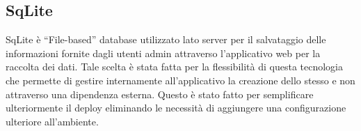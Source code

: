 \subsection{SqLite}\vspace{5mm}

	SqLite è “File-based” database utilizzato lato server per il salvataggio delle informazioni fornite dagli utenti admin attraverso l’applicativo web per la raccolta dei dati. Tale scelta è stata fatta per la flessibilità di questa tecnologia che permette di gestire internamente all’applicativo la creazione dello stesso e non attraverso una dipendenza esterna. Questo è stato fatto per semplificare ulteriormente il deploy eliminando le necessità di aggiungere una configurazione ulteriore all’ambiente.\vspace{5mm}


